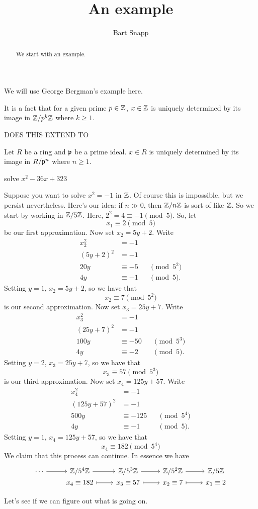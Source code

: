 \documentclass{ximera}
\author{Bart Snapp}
\title{An example}
\begin{document}
\begin{abstract}
  We start with an example. 
\end{abstract}
\maketitle

We will use George Bergman's example here.

\begin{proposition}
  It is a fact that for a given prime $p\in \mathbb Z$, $x\in\mathbb Z$ is uniquely
  determined by its image in $\mathbb Z/p^k\mathbb Z$ where $k\ge 1$.
\end{proposition}

DOES THIS EXTEND TO

\begin{proposition}[?]
  Let $R$ be a ring and $\mathfrak{p}$ be a prime ideal. $x\in R$ is uniquely
  determined by its image in $R/\mathfrak{p}^n$ where $n\ge 1$.
\end{proposition}

solve $x^2-36 x+323$



Suppose you want to solve $x^2 =-1$ in $\mathbb Z$. Of course this is
impossible, but we persist nevertheless. Here's our idea: if $n\gg 0$,
then $\mathbb Z/n \mathbb Z$ is sort of like $\mathbb Z$. So we start by working in
$\mathbb Z/5\mathbb Z$. Here, $2^2 = 4 \equiv -1\pmod{5}$. So, let
\[
x_1\equiv 2\pmod{5}
\]
be our first approximation.  Now set $x_2 = 5 y +2$. Write
\begin{align*}
  x_2^2 &= -1 \\
  (5 y +2)^2 &= -1\\
  20y &\equiv -5 && \pmod{5^2}\\
  4y &\equiv -1 &&\pmod{5}.
\end{align*}
Setting $y = 1$, $x_2 = 5y+2$, so we have that
\[
x_2 \equiv 7 \pmod{5^2}
\]
is our second approximation. Now set $x_3 = 25 y + 7$. Write
\begin{align*}
  x_3^2 &= -1\\
  (25 y + 7)^2 &= -1\\
  100y &\equiv -50 && \pmod{5^3}\\
  4y &\equiv -2 &&\pmod{5}.
\end{align*}
Setting $y = 2$, $x_3= 25 y + 7$, so we have that
\[
x_3 \equiv 57 \pmod{5^3}
\]
is our third approximation. Now set $x_4 = 125 y + 57$. Write
\begin{align*}
x_4^2 &= -1\\
(125y + 57)^2 &=-1\\
500y &\equiv -125 && \pmod{5^4}\\
4y &\equiv -1 && \pmod{5}.
\end{align*}
Setting $y = 1$, $x_4 = 125y + 57$, so we have that
\[
x_4 \equiv 182 \pmod{5^4}
\]
We claim that this process can continue. In essence we have
\[
\begin{tikzcd}[row sep=0em,]
  \cdots \ar[r] & \Z/5^4\Z \ar[r] & \Z/5^3\Z \ar[r] & \Z/5^2\Z \ar[r] & \Z/5\Z \\
  & x_4\equiv 182 \ar[r,mapsto] & x_3\equiv 57 \ar[r,mapsto] & x_2\equiv 7 \ar[r,mapsto] &  x_1\equiv 2
\end{tikzcd}
\]

Let's see if we can figure out what is going on.
\end{document}
